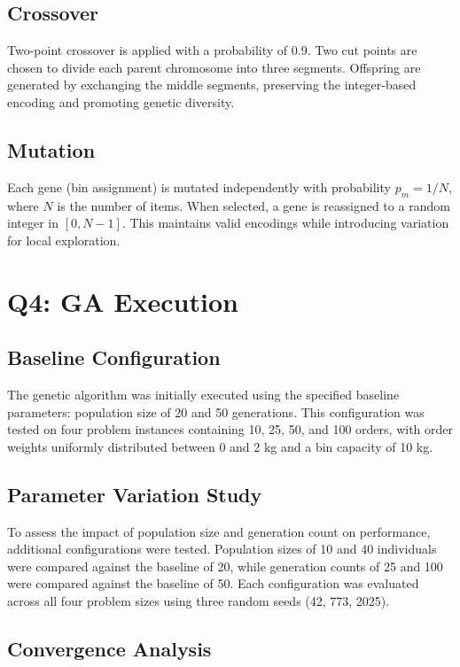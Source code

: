 \documentclass[journal,12pt,onecolumn]{IEEEtran}
\begin{document}
\subsection{Crossover}

Two-point crossover is applied with a probability of 0.9. Two cut points are chosen to divide each parent chromosome into three segments. Offspring are generated by exchanging the middle segments, preserving the integer-based encoding and promoting genetic diversity.

\subsection{Mutation}

Each gene (bin assignment) is mutated independently with probability $p_m = 1/N$, where $N$ is the number of items. When selected, a gene is reassigned to a random integer in $[0, N-1]$. This maintains valid encodings while introducing variation for local exploration.

\section{Q4: GA Execution}

\subsection{Baseline Configuration}

The genetic algorithm was initially executed using the specified baseline parameters: population size of 20 and 50 generations. This configuration was tested on four problem instances containing 10, 25, 50, and 100 orders, with order weights uniformly distributed between 0 and 2 kg and a bin capacity of 10 kg.

\subsection{Parameter Variation Study}

To assess the impact of population size and generation count on performance, additional configurations were tested. Population sizes of 10 and 40 individuals were compared against the baseline of 20, while generation counts of 25 and 100 were compared against the baseline of 50. Each configuration was evaluated across all four problem sizes using three random seeds (42, 773, 2025).

\subsection{Convergence Analysis}
\end{document}
